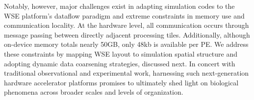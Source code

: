Notably, however, major challenges exist in adapting simulation codes to the WSE platform's dataflow paradigm and extreme constraints in memory use and communication locality.
At the hardware level, all communication occurs through message passing between directly adjacent processing tiles.
Additionally, although on-device memory totals nearly 50GB, only 48kb is available per PE.
We address these constraints by mapping WSE layout to simulation spatial structure and adopting dynamic data coarsening strategies, discussed next.
In concert with traditional observational and experimental work, harnessing such next-generation hardware accelerator platforms promises to ultimately shed light on biological phenomena across broader scales and levels of organization.







